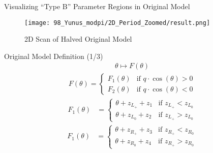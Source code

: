 \begin{frame}{Visualizing ``Type B'' Parameter Regions in Original Model}
	\begin{figure}
		\centering
		\texttt{[image: 98\_Yunus\_modpi/2D\_Period\_Zoomed/result.png]}
		\caption{2D Scan of Halved Original Model}
	\end{figure}
\end{frame}

\begin{frame}{Original Model Definition (1/3)}
	\vspace{-3.0em}
	\begin{align}
		\theta \mapsto F(\theta)
	\end{align}
	\begin{align}
		F(\theta) = \begin{cases}
			            F_1(\theta) & \text{if } q \cdot \cos(\theta) > 0 \\
			            F_2(\theta) & \text{if } q \cdot \cos(\theta) < 0
		            \end{cases}
	\end{align}
	\begin{align}
		F_1(\theta) & = \begin{cases}
			                \theta + z_{L_+} + z_1 & \text{if } z_{L_+} < z_{L_0} \\
			                \theta + z_{L_0} + z_2 & \text{if } z_{L_+} > z_{L_0}
		                \end{cases}
	\end{align}
	\begin{align}
		F_1(\theta) & = \begin{cases}
			                \theta + z_{R_+} + z_3 & \text{if } z_{R_+} < z_{R_0} \\
			                \theta + z_{R_0} + z_4 & \text{if } z_{R_+} > z_{R_0}
		                \end{cases}
	\end{align}
\end{frame}

